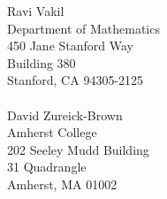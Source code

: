 \documentclass[a4paper,10pt]{article}
\begin{document}
\begin{multicols}{2}
\begin{flushleft}
	Ravi Vakil\\
	Department of Mathematics\\
	450 Jane Stanford Way\\
	Building 380\\
	Stanford, CA 94305-2125\\ \ \\

	David Zureick-Brown \\
	Amherst College \\
	202 Seeley Mudd Building\\
	31 Quadrangle\\
	Amherst, MA 01002\\ \ \\ \ \\ \ \\
\end{flushleft}


\end{multicols}
\end{document}
